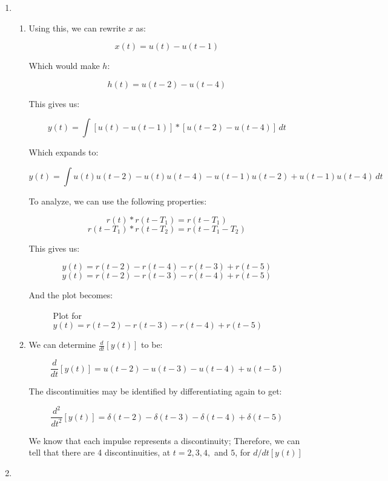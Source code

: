 \begin{enumerate}
  \item

    \begin{enumerate}

      \item Using this, we can rewrite $x$ as:

        $$x(t)=u(t)-u(t-1)$$

        Which would make $h$:

        $$h(t)=u(t-2)-u(t-4)$$

        This gives us:

        $$y(t)=\int[u(t)-u(t-1)]*[u(t-2)-u(t-4)]\,dt$$

        Which expands to:

        $$y(t)=\int u(t)u(t-2)-u(t)u(t-4)-u(t-1)u(t-2)+u(t-1)u(t-4)\,dt$$

        To analyze, we can use the following properties:

        $$r(t)*r(t-T_1)=r(t-T_1)$$
        $$r(t-T_1)*r(t-T_2)=r(t-T_1-T_2)$$

        This gives us:

        $$y(t)=r(t-2)-r(t-4)-r(t-3)+r(t-5)$$
        $$\boxed{y(t)=r(t-2)-r(t-3)-r(t-4)+r(t-5)}$$

        And the plot becomes:

        \begin{figure}[H]
          \centering
          
          \caption{Plot for $y(t)=r(t-2)-r(t-3)-r(t-4)+r(t-5)$}
          \label{fig:3}
        \end{figure}

      \item 

        We can determine $\frac{d}{dt}[y(t)]$ to be:

        $$\frac{d}{dt}[y(t)]=u(t-2)-u(t-3)-u(t-4)+u(t-5)$$

        The discontinuities may be identified by differentiating again to get:

        $$\frac{d^2}{dt^2}[y(t)]=\delta(t-2)-\delta(t-3)-\delta(t-4)+\delta(t-5)$$

        We know that each impulse represents a discontinuity; Therefore, we can tell that there are 4 discontinuities, at $t=2,3,4,$ and $5$, for $d/dt[y(t)]$

    \end{enumerate}

  \item

    \begin{enumerate}


\end{enumerate}
\end{enumerate}

